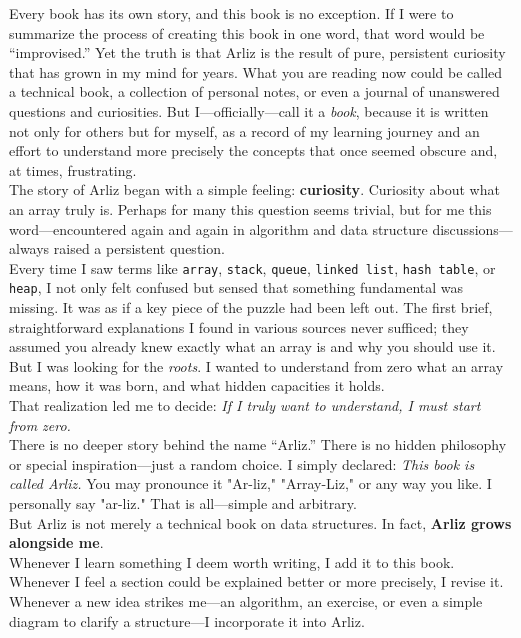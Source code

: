 \documentclass[12pt, oneside, openany]{book}
\begin{document}
	Every book has its own story, and this book is no exception. If I were to summarize the process of creating this book in one word, that word would be “improvised.” Yet the truth is that Arliz is the result of pure, persistent curiosity that has grown in my mind for years. What you are reading now could be called a technical book, a collection of personal notes, or even a journal of unanswered questions and curiosities. But I—officially—call it a \emph{book}, because it is written not only for others but for myself, as a record of my learning journey and an effort to understand more precisely the concepts that once seemed obscure and, at times, frustrating.\\
	The story of Arliz began with a simple feeling: \textbf{curiosity}.  
	Curiosity about what an array truly is. Perhaps for many this question seems trivial, but for me this word—encountered again and again in algorithm and data structure discussions—always raised a persistent question.\\
	Every time I saw terms like \texttt{array}, \texttt{stack}, \texttt{queue}, \texttt{linked list}, \texttt{hash table}, or \texttt{heap}, I not only felt confused but sensed that something fundamental was missing. It was as if a key piece of the puzzle had been left out. The first brief, straightforward explanations I found in various sources never sufficed; they assumed you already knew exactly what an array is and why you should use it. But I was looking for the \emph{roots}. I wanted to understand from zero what an array means, how it was born, and what hidden capacities it holds.\\
	That realization led me to decide:  
	\emph{If I truly want to understand, I must start from zero.}\\	
	There is no deeper story behind the name “Arliz.” There is no hidden philosophy or special inspiration—just a random choice. I simply declared:  
	\emph{This book is called Arliz.}  
	You may pronounce it "Ar-liz," "Array-Liz," or any way you like. I personally say "ar-liz." That is all—simple and arbitrary.\\	
	But Arliz is not merely a technical book on data structures. In fact, \textbf{Arliz grows alongside me}. \\
	Whenever I learn something I deem worth writing, I add it to this book. Whenever I feel a section could be explained better or more precisely, I revise it. Whenever a new idea strikes me—an algorithm, an exercise, or even a simple diagram to clarify a structure—I incorporate it into Arliz.\\
\end{document}
